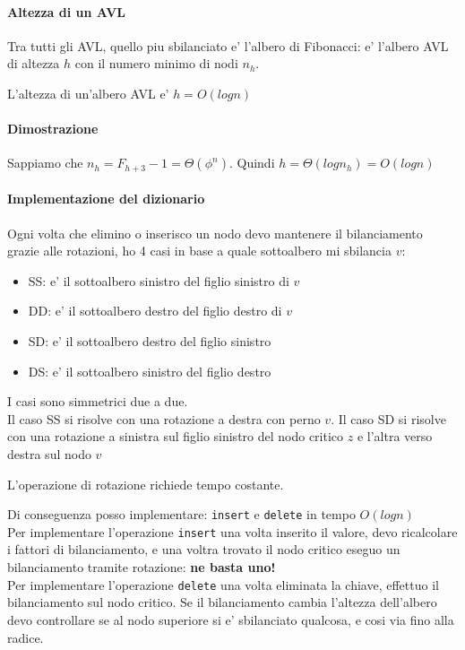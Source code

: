     \paragraph{Altezza di un AVL}
    Tra tutti gli AVL, quello piu sbilanciato e' l'albero di Fibonacci: e' l'albero AVL di altezza $h$ con
    il numero minimo di nodi $n_h$.

    \begin{definition}
        L'altezza di un'albero AVL e' $h=O(log n)$
    \end{definition}
    \paragraph{Dimostrazione}
        Sappiamo che $n_h = F_{h+3}-1= \Theta(\phi^n)$.
        Quindi $h = \Theta(log n_h) = O(log n)$
    \paragraph{Implementazione del dizionario}
        Ogni volta che elimino o inserisco un nodo devo mantenere il bilanciamento grazie alle rotazioni, ho 4 casi in base a quale sottoalbero mi sbilancia $v$:
        \begin{itemize}
            \item SS: e' il sottoalbero sinistro del figlio sinistro di $v$
            \item DD: e' il sottoalbero destro del figlio destro di $v$
            \item SD: e' il sottoalbero destro del figlio sinistro
            \item DS: e' il sottoalbero sinistro del figlio destro
        \end{itemize}

        I casi sono simmetrici due a due. \\
        Il caso SS si risolve con una rotazione a destra con perno $v$.
        Il caso SD si risolve con una rotazione a sinistra sul figlio sinistro del nodo critico $z$ e l'altra verso destra sul nodo $v$

        L'operazione di rotazione richiede tempo costante.

        Di conseguenza posso implementare: \texttt{insert} e \texttt{delete} in tempo $O(logn)$ \\

        Per implementare l'operazione \texttt{insert} una volta inserito il valore, devo ricalcolare i fattori di bilanciamento,
        e una voltra trovato il nodo critico eseguo un bilanciamento tramite rotazione: \textbf{ne basta uno!} \\

        Per implementare l'operazione \texttt{delete} una volta eliminata la chiave, effettuo il bilanciamento sul nodo critico.
        Se il bilanciamento cambia l'altezza dell'albero devo controllare se al nodo superiore si e' sbilanciato qualcosa, e cosi via 
        fino alla radice.